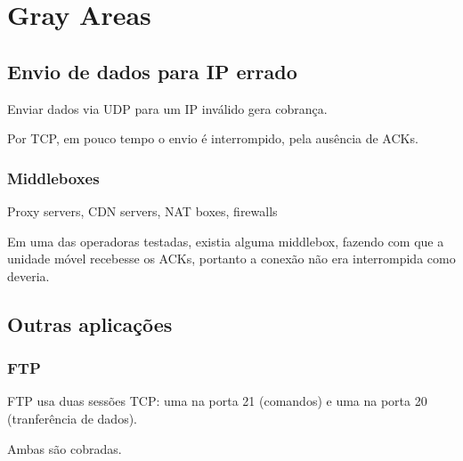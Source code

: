\documentclass[brazil]{beamer}
\begin{document}
\section{Gray Areas}

\subsection{Envio de dados para IP errado}

\begin{frame}[fragile]
    Enviar dados via UDP para um IP inválido gera cobrança.

    \vspace{0.4cm}
    Por TCP, em pouco tempo o envio é interrompido, pela ausência de ACKs.
\end{frame}

\begin{frame}[fragile]
    \frametitle{Middleboxes}
    Proxy servers, CDN servers, NAT boxes, firewalls

    \vspace{0.4cm}
    \pause
    Em uma das operadoras testadas, existia alguma middlebox, fazendo com que a unidade móvel recebesse os ACKs, portanto a conexão não era interrompida como deveria.
\end{frame}

\subsection{Outras aplicações}

\begin{frame}[fragile]
    \frametitle{FTP}
    FTP usa duas sessões TCP: uma na porta 21 (comandos) e uma na porta 20 (tranferência de dados).

    \vspace{0.5cm}
    Ambas são cobradas.
\end{frame}
\end{document}
